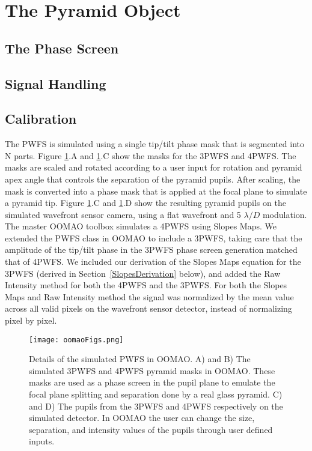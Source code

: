 \section{The Pyramid Object}
\subsection{The Phase Screen}
\subsection{Signal Handling}
\subsection{Calibration}





The PWFS is simulated using a single tip/tilt phase mask that is segmented into N parts. Figure \ref{fig:oomaoFigs}.A and \ref{fig:oomaoFigs}.C show the masks for the 3PWFS and 4PWFS. The masks are scaled and rotated according to a user input for rotation and pyramid apex angle that controls the separation of the pyramid pupils. After scaling, the mask is converted into a phase mask that is applied at the focal plane to simulate a pyramid tip. Figure \ref{fig:oomaoFigs}.C and \ref{fig:oomaoFigs}.D show the resulting pyramid pupils on the simulated wavefront sensor camera, using a flat wavefront and 5 $\lambda/D$ modulation. The master OOMAO toolbox simulates a 4PWFS using Slopes Maps. We extended the PWFS class in OOMAO to include a 3PWFS, taking care that the amplitude of the tip/tilt phase in the 3PWFS phase screen generation matched that of 4PWFS. We included our derivation of the Slopes Maps equation for the 3PWFS (derived in Section~\ref{SlopesDerivation} below), and added the Raw Intensity method for both the 4PWFS and the 3PWFS. For both the Slopes Maps and Raw Intensity method the signal was normalized by the mean value across all valid pixels on the wavefront sensor detector, instead of normalizing pixel by pixel. 

\begin{figure}
    \centering
    \texttt{[image: oomaoFigs.png]}
    \caption{Details of the simulated PWFS in OOMAO. A) and B) The simulated 3PWFS and 4PWFS pyramid masks in OOMAO. These masks are used as a phase screen in the pupil plane to emulate the focal plane splitting and separation done by a real glass pyramid. C) and D) The pupils from the 3PWFS and 4PWFS respectively on the simulated detector. In OOMAO the user can change the size, separation, and intensity values of the pupils through user defined inputs.}
    \label{fig:oomaoFigs}
\end{figure}


